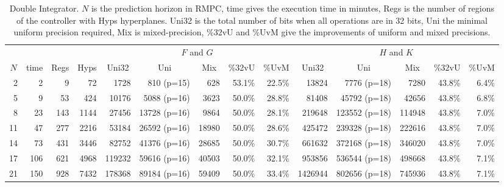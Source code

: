 \begin{table*}[p]
  \centering
  \caption{Double Integrator.\textmd{ $N$ is the prediction horizon in RMPC, time gives the execution time in minutes, Regs is the number of regions of the controller with Hyps hyperplanes. Uni32 is the total number of bits when all operations are in 32 bits, Uni the minimal uniform precision required, Mix is mixed-precision, \%32vU and \%UvM give the improvements of uniform and mixed precisions.}}
  \label{tab:di}
  \renewcommand{\arraystretch}{1.2}
  \setlength{\tabcolsep}{0.5em} %
  \begin{tabular}{rrrr|rrrrr|rrrrr}
    \toprule
    \multicolumn{4}{c}{} & \multicolumn{5}{|c|}{$F$ and $G$} & \multicolumn{5}{c}{$H$ and $K$} \\
    \multicolumn{1}{c}{$N$}&
    \multicolumn{1}{c}{time}&
    \multicolumn{1}{c}{Regs} &
    \multicolumn{1}{c}{Hyps} &
    \multicolumn{1}{|c}{Uni32}&
    \multicolumn{1}{c}{Uni}&
    \multicolumn{1}{c}{Mix}&
    \multicolumn{1}{c}{\%32vU}&
    \multicolumn{1}{c}{\%UvM}&
    \multicolumn{1}{|c}{Uni32}&
    \multicolumn{1}{c}{Uni}&
    \multicolumn{1}{c}{Mix}&
    \multicolumn{1}{c}{\%32vU}&
    \multicolumn{1}{c}{\%UvM} \\
    \midrule
    2 & 2 & 9 & 72 & 1728 & 810 (p=15) & 628 & 53.1\% & 22.5\% & 13824 & 7776 (p=18) & 7280 & 43.8\%& 6.4\% \\
    5 & 9 & 53 & 424 & 10176 & 5088 (p=16) & 3623 & 50.0\% & 28.8\% & 81408 & 45792 (p=18) & 42656 & 43.8\% & 6.8\% \\
    8 & 23 & 143 & 1144 & 27456 & 13728 (p=16) & 9864 & 50.0\%  & 28.1\% & 219648 & 123552 (p=18) & 114948 & 43.8\% & 7.0\% \\
    11 & 47 & 277 & 2216 & 53184 & 26592 (p=16) & 18980 & 50.0\% & 28.6\% & 425472 & 239328 (p=18) & 222616 & 43.8\% & 7.0\% \\
    
    14 & 73 & 431& 3446& 82752& 41376 (p=16)& 28685& 50.0\% & 30.7\% & 661632& 372168 (p=18)& 346020& 43.8\% &7.0\% \\
    
    17 & 106 & 621 & 4968 & 119232 & 59616 (p=16) & 40503 & 50.0\% & 32.1\% & 953856& 536544 (p=18)& 498668& 43.8\% & 7.1\% \\
    
    21 & 150 & 928 & 7432 & 178368 & 89184 (p=16) & 59409 & 50.0\% & 33.4\% & 1426944 & 802656 (p=18) & 745936 & 43.8\% & 7.1\%  \\
    

\end{tabular}
\end{table*}
